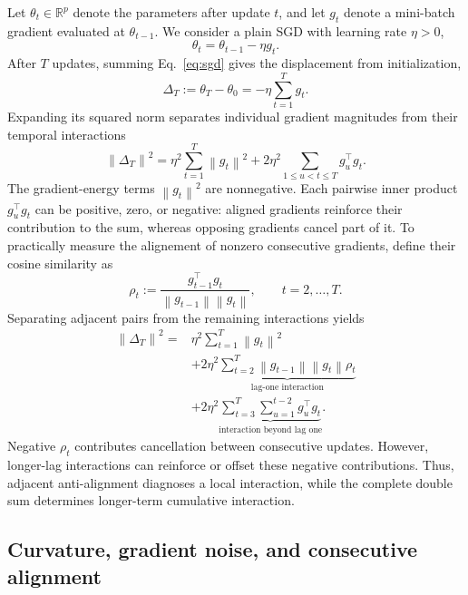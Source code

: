 \documentclass[11pt]{article}
\newcommand{\norm}[1]{\left\lVert#1\right\rVert}
\begin{document}
Let $\theta_t\in\mathbb{R}^p$ denote the parameters after update $t$, and let
$g_t$ denote a mini-batch gradient evaluated at $\theta_{t-1}$. We consider
a plain SGD with learning rate $\eta>0$, 
\begin{equation}
  \theta_t=\theta_{t-1}-\eta g_t.
  \label{eq:sgd}
\end{equation}
After $T$ updates, summing Eq.~\eqref{eq:sgd} gives the displacement from
initialization,
\begin{equation}
  \Delta_T:=\theta_T-\theta_0=-\eta\sum_{t=1}^T g_t.
  \label{eq:displacement}
\end{equation}
Expanding its squared norm separates individual gradient magnitudes from their
temporal interactions
\begin{equation}
  \norm{\Delta_T}^2
  =\eta^2\sum_{t=1}^T\norm{g_t}^2
   +2\eta^2\sum_{1\leq u<t\leq T}g_u^\top g_t.
  \label{eq:energy-interaction}
\end{equation}
The gradient-energy terms $\norm{g_t}^2$ are nonnegative. Each pairwise inner product
$g_u^\top g_t$ can be
positive, zero, or negative: aligned gradients reinforce their contribution to
the sum, whereas opposing gradients cancel part of it. 
To practically measure the alignement of nonzero consecutive gradients, define their cosine similarity as
\begin{equation}
  \rho_t:=\frac{g_{t-1}^\top g_t}{\norm{g_{t-1}}\norm{g_t}},
  \qquad t=2,\ldots,T.
  \label{eq:rho}
\end{equation}
Separating adjacent pairs from the remaining interactions yields
\begin{equation}
\begin{aligned}
\norm{\Delta_T}^2={}&\eta^2\sum_{t=1}^T\norm{g_t}^2\\
 &+2\eta^2\underbrace{\sum_{t=2}^T
    \norm{g_{t-1}}\norm{g_t}\rho_t}_{\text{lag-one interaction}}\\
 &+2\eta^2\underbrace{\sum_{t=3}^T\sum_{u=1}^{t-2}
    g_u^\top g_t}_{\text{interaction beyond lag one}}.
\end{aligned}
\label{eq:lag-split}
\end{equation}
Negative $\rho_t$ contributes cancellation between consecutive updates. However,
longer-lag interactions can reinforce or offset these negative contributions.
Thus, adjacent anti-alignment diagnoses a local interaction, while the complete
double sum determines longer-term cumulative interaction. 

\subsection{Curvature, gradient noise, and consecutive alignment}
\end{document}
